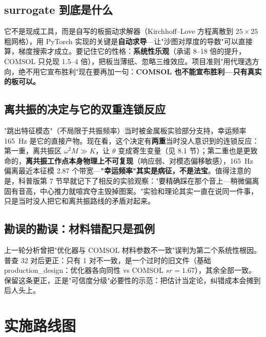 \documentclass[11pt,a4paper]{article}
\begin{document}
\subsection{surrogate 到底是什么}

它不是现成工具，而是自写的板振动求解器（Kirchhoff--Love 方程离散到 $25\times 25$ 粗网格），用 PyTorch 实现的关键是\textbf{自动求导}---让"沙图对厚度的导数"可以直接算，梯度搜索才成立。要记住它的性格：\textbf{系统性乐观}（承诺 8--18 倍的提升，COMSOL 只兑现 1.5--4 倍），把板当薄纸、忽略三维效应。项目准则"用代理选方向，绝不用它宣布胜利"现在要再加一句：\textbf{COMSOL 也不能宣布胜利---只有真实的板可以。}

\subsection{离共振的决定与它的双重连锁反应}

"跳出特征模态"（不局限于共振频率）当时被金属板实验部分支持，幸运频率 165~Hz 是它的直接产物。现在看，这个决定有\textbf{两重}当时没人意识到的连锁反应：第一重，离共振区 $\omega^2 M \gg K$，让 $\theta$ 变成寄生变量（见 8.1 节）；第二重也是更致命的，\textbf{离共振工作点本身物理上不可复现}（响应弱、对模态偏移敏感），165~Hz 偏离最近本征模 2.87 个带宽---\textbf{"幸运频率"其实是病征，不是法宝}。值得注意的是，科普版第 7 节早就记下了相反的实验观察："要精确踩在那个音上---稍微偏离固有音高，中心推力就喧宾夺主毁掉图案。"实验和理论其实一直在说同一件事，只是当时没人把它和离共振路线的矛盾对起来。

\subsection{勘误的勘误：材料错配只是孤例}

上一轮分析曾把"优化器与 COMSOL 材料参数不一致"误判为第二个系统性根因。普查 32 对后更正：只有 1 对不一致，是一个过时的旧文件（基础 production\_design：优化器各向同性 vs COMSOL $sr=1.67$），其余全部一致。保留这条更正，正是"可信度分级"必要性的示范：把估计当定论，纠错成本会摊到后人头上。

\section{实施路线图}
\end{document}
